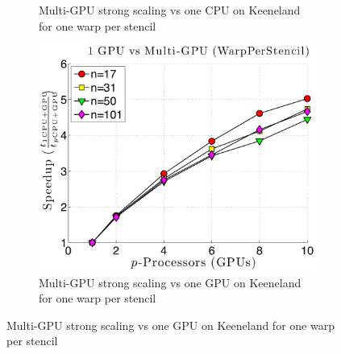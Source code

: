 \begin{figure}
\begin{subfigure}[t]{0.425\textwidth}
\caption{Multi-GPU strong scaling vs one CPU on Keeneland for one warp per stencil}
\label{fig:alltoall_multigpu_vs_cpu_scaling}
\end{subfigure} 
\begin{subfigure}[t]{0.425\textwidth}
\centering
\includegraphics[width=1.0\textwidth]{../figures/keeneland_results/alltoallv_cosine/speedup_1GPU_vs_NGPU_WarpPerStencil.pdf}
\caption{Multi-GPU strong scaling vs one GPU on Keeneland for one warp per stencil}
\label{fig:alltoall_multigpu_vs_gpu_scaling}
\end{subfigure} 
\end{figure}

